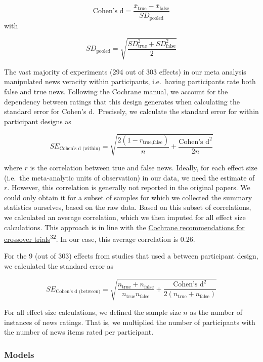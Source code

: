 \documentclass[
  doc,floatsintext]{apa6}
\begin{document}
\[
\text{Cohen's d} = \frac{\bar{x}_{\text{true}} - \bar{x}_{\text{false}}}{SD_{\text{pooled}}}
\] with

\[
SD_{\text{pooled}} = \sqrt{\frac{SD_{\text{true}}^2+SD_{\text{false}}^2}{2}}
\]

The vast majority of experiments (294 out of 303 effects) in our meta analysis manipulated news veracity within participants, i.e.~having participants rate both false and true news. Following the Cochrane manual, we account for the dependency between ratings that this design generates when calculating the standard error for Cohen's d.~Precisely, we calculate the standard error for within participant designs as

\[
SE_{\text{Cohen's d (within)}} = \sqrt{\frac{2(1-r_{\text{true},\text{false}})}{n}+\frac{\text{Cohen's d}^2}{2n}}
\]

where \(r\) is the correlation between true and false news. Ideally, for each effect size (i.e.~the meta-analytic units of observation) in our data, we need the estimate of \(r\). However, this correlation is generally not reported in the original papers. We could only obtain it for a subset of samples for which we collected the summary statistics ourselves, based on the raw data. Based on this subset of correlations, we calculated an average correlation, which we then imputed for all effect size calculations. This approach is in line with the \href{https://training.cochrane.org/handbook/current/chapter-23\#section-23-2-7-3}{Cochrane recommendations for crossover trials}\textsuperscript{32}. In our case, this average correlation is 0.26.

For the 9 (out of 303) effects from studies that used a between participant design, we calculated the standard error as

\[
SE_{\text{Cohen's d (between)}} = \sqrt{\frac{n_{\text{true}}+n_{\text{false}}}{n_{\text{true}}n_{\text{false}}}+\frac{\text{Cohen's d}^2}{2(n_{\text{true}}+n_{\text{false}})}}
\]

For all effect size calculations, we defined the sample size \(n\) as the number of instances of news ratings. That is, we multiplied the number of participants with the number of news items rated per participant.

\subsubsection{Models}\label{models}
\end{document}
